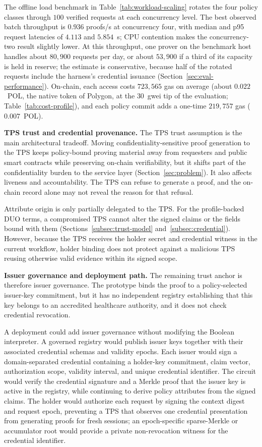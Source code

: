 The offline load benchmark in Table~\ref{tab:workload-scaling} rotates the four policy classes through $100$ verified requests at each concurrency level.
The best observed batch throughput is $0.936$ proofs/s at concurrency four, with median and p95 request latencies of $4.113$ and $5.854$~s; CPU contention makes the concurrency-two result slightly lower.
At this throughput, one prover on the benchmark host handles about $80{,}900$ requests per day, or about $53{,}900$ if a third of its capacity is held in reserve; the estimate is conservative, because half of the rotated requests include the harness's credential issuance (Section~\ref{sec:eval-performance}).
On-chain, each access costs $723{,}565$ gas on average (about $0.022$~POL, the native token of Polygon, at the $30$~gwei tip of the evaluation; Table~\ref{tab:cost-profile}), and each policy commit adds a one-time $219{,}757$ gas ($0.007$~POL).


\textbf{TPS trust and credential provenance.}
The TPS trust assumption is the main architectural tradeoff.
Moving confidentiality-sensitive proof generation to the TPS keeps policy-bound proving material away from requesters and public smart contracts while preserving on-chain verifiability, but it shifts part of the confidentiality burden to the service layer (Section~\ref{sec:problem}).
It also affects liveness and accountability.
The TPS can refuse to generate a proof, and the on-chain record alone may not reveal the reason for that refusal.

Attribute origin is only partially delegated to the TPS.
For the profile-backed DUO terms, a compromised TPS cannot alter the signed claims or the fields bound with them (Sections~\ref{subsec:trust-model} and~\ref{subsec:credential}).
However, because the TPS receives the holder secret and credential witness in the current workflow, holder binding does not protect against a malicious TPS reusing otherwise valid evidence within its signed scope.

\textbf{Issuer governance and deployment path.}
The remaining trust anchor is therefore issuer governance. The prototype binds the proof to a policy-selected issuer-key commitment, but it has no independent registry establishing that this key belongs to an accredited healthcare authority, and it does not check credential revocation.

A deployment could add issuer governance without modifying the Boolean interpreter.
A governed registry would publish issuer keys together with their associated credential schemas and validity epochs.
Each issuer would sign a domain-separated credential containing a holder-key commitment, claim vector, authorization scope, validity interval, and unique credential identifier.
The circuit would verify the credential signature and a Merkle proof that the issuer key is active in the registry, while continuing to derive policy attributes from the signed claims. The holder would authorize each request by signing the context digest and request epoch, preventing a TPS that observes one credential presentation from generating proofs for fresh sessions; an epoch-specific sparse-Merkle or accumulator root would provide a private non-revocation witness for the credential identifier.

